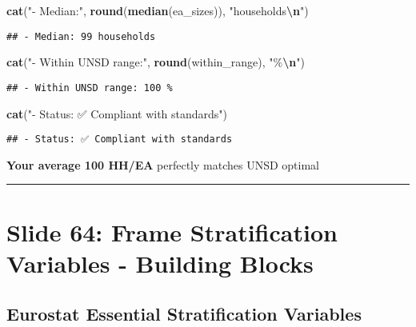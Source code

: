 \documentclass[
]{article}
\newenvironment{Shaded}{\begin{snugshade}}{\end{snugshade}}
\newcommand{\FunctionTok}[1]{\textcolor[rgb]{0.13,0.29,0.53}{\textbf{#1}}}
\newcommand{\NormalTok}[1]{#1}
\newcommand{\SpecialCharTok}[1]{\textcolor[rgb]{0.81,0.36,0.00}{\textbf{#1}}}
\newcommand{\StringTok}[1]{\textcolor[rgb]{0.31,0.60,0.02}{#1}}
\begin{document}
\begin{Shaded}
\begin{Highlighting}[]
\FunctionTok{cat}\NormalTok{(}\StringTok{"{-} Median:"}\NormalTok{, }\FunctionTok{round}\NormalTok{(}\FunctionTok{median}\NormalTok{(ea\_sizes)), }\StringTok{"households}\SpecialCharTok{\textbackslash{}n}\StringTok{"}\NormalTok{)}
\end{Highlighting}
\end{Shaded}

\begin{verbatim}
## - Median: 99 households
\end{verbatim}

\begin{Shaded}
\begin{Highlighting}[]
\FunctionTok{cat}\NormalTok{(}\StringTok{"{-} Within UNSD range:"}\NormalTok{, }\FunctionTok{round}\NormalTok{(within\_range), }\StringTok{"\%}\SpecialCharTok{\textbackslash{}n}\StringTok{"}\NormalTok{)}
\end{Highlighting}
\end{Shaded}

\begin{verbatim}
## - Within UNSD range: 100 %
\end{verbatim}

\begin{Shaded}
\begin{Highlighting}[]
\FunctionTok{cat}\NormalTok{(}\StringTok{"{-} Status: ✅ Compliant with standards"}\NormalTok{)}
\end{Highlighting}
\end{Shaded}

\begin{verbatim}
## - Status: ✅ Compliant with standards
\end{verbatim}

\textbf{Your average 100 HH/EA} perfectly matches UNSD optimal

\begin{center}\rule{0.5\linewidth}{0.5pt}\end{center}

\section{Slide 64: Frame Stratification Variables - Building
Blocks}\label{slide-64-frame-stratification-variables---building-blocks}

\subsection{Eurostat Essential Stratification
Variables}\label{eurostat-essential-stratification-variables}
\end{document}
